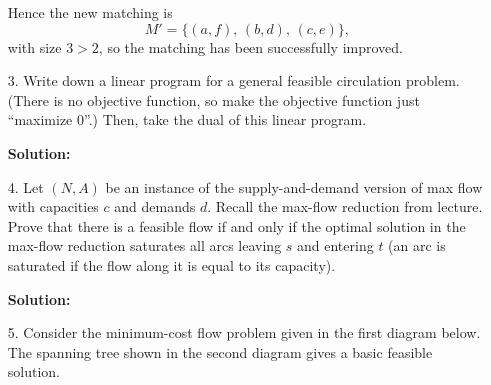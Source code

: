 \documentclass{article}
\begin{document}
\begin{enumerate}
Hence the new matching is
\[
M'=\{(a,f),\,(b,d),\,(c,e)\},
\]
with size \(3>2\), so the matching has been successfully improved.


    \newpage

    \item[3.] Write down a linear program for a general feasible circulation problem. (There is no objective function, so make the objective function just ``maximize 0''.)
    Then, take the dual of this linear program.

    \textbf{Solution:} \\



    \newpage

    \item[4.] Let $(N, A)$ be an instance of the supply-and-demand version of max flow with capacities $c$ and demands $d$. Recall the max-flow reduction from lecture. Prove that there is a feasible flow if and only if the optimal solution in the max-flow reduction saturates all arcs leaving $s$ and entering $t$ (an arc is saturated if the flow along it is equal to its capacity).

    \textbf{Solution:} \\



    \newpage

    \item[5.] Consider the minimum-cost flow problem given in the first diagram below. The spanning tree shown in the second diagram gives a basic feasible solution.

    \begin{figure}[h]
    \centering
        \begin{subfigure}
            \centering
\end{subfigure}
\end{figure}
\end{enumerate}
\end{document}
